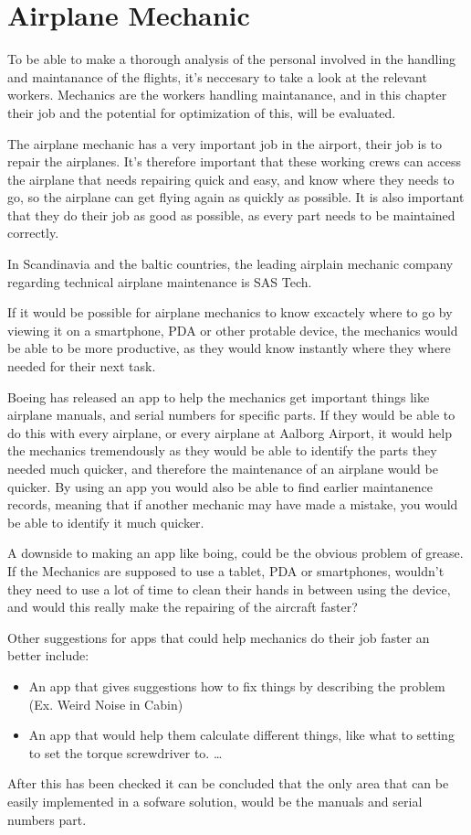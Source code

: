 \section{Airplane Mechanic}
To be able to make a thorough analysis of the personal involved in the handling and maintanance of the flights, it's neccesary to take a look at the relevant workers. Mechanics are the workers handling maintanance, and in this chapter their job and the potential for optimization of this, will be evaluated.

The airplane mechanic has a very important job in the airport, their job is to repair the airplanes. It's therefore important that these working crews can access the airplane that needs repairing quick and easy, and know where they needs to go, so the airplane can get flying again as quickly as possible. It is also important that they do their job as good as possible, as every part needs to be maintained correctly.

In Scandinavia and the baltic countries, the leading airplain mechanic company regarding technical airplane maintenance is SAS Tech.\cite{sas_tech_mechanic}

If it would be possible for airplane mechanics to know excactely where to go by viewing it on a smartphone, PDA or other protable device, the mechanics would be able to be more productive, as they would know instantly where they where needed for their next task. 

Boeing has released an app to help the mechanics get important things like airplane manuals, and serial numbers for specific parts. If they would be able to do this with every airplane, or every airplane at Aalborg Airport, it would help the mechanics tremendously as they would be able to identify the parts they needed much quicker, and therefore the maintenance of an airplane would be quicker. By using an app you would also be able to find earlier maintanence records, meaning that if another mechanic may have made a mistake, you would be able to identify it much quicker.\cite{cnet_boeing_app}

A downside to making an app like boing, could be the obvious problem of grease. If the Mechanics are supposed to use a tablet, PDA or smartphones, wouldn't they need to use a lot of time to clean their hands in between using the device, and would this really make the repairing of the aircraft faster?

Other suggestions for apps that could help mechanics do their job faster an better include:
\begin{itemize}
\item An app that gives suggestions how to fix things by describing the problem (Ex. Weird Noise in Cabin)
\item An app that would help them calculate different things, like what to setting to set the torque screwdriver to. \ldots
\end{itemize}

After this has been checked it can be concluded that the only area that can be easily implemented in a sofware solution, would be the manuals and serial numbers part.
